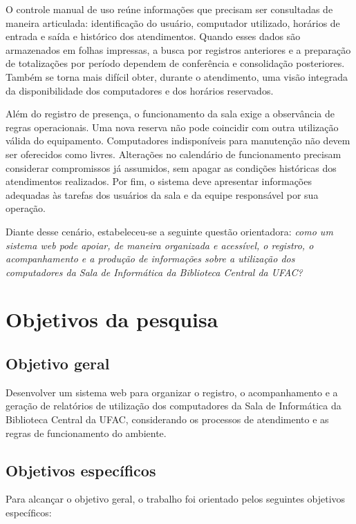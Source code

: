 O controle manual de uso reúne informações que precisam ser consultadas de maneira articulada: identificação do usuário, computador utilizado, horários de entrada e saída e histórico dos atendimentos. Quando esses dados são armazenados em folhas impressas, a busca por registros anteriores e a preparação de totalizações por período dependem de conferência e consolidação posteriores. Também se torna mais difícil obter, durante o atendimento, uma visão integrada da disponibilidade dos computadores e dos horários reservados.

Além do registro de presença, o funcionamento da sala exige a observância de regras operacionais. Uma nova reserva não pode coincidir com outra utilização válida do equipamento. Computadores indisponíveis para manutenção não devem ser oferecidos como livres. Alterações no calendário de funcionamento precisam considerar compromissos já assumidos, sem apagar as condições históricas dos atendimentos realizados. Por fim, o sistema deve apresentar informações adequadas às tarefas dos usuários da sala e da equipe responsável por sua operação.

Diante desse cenário, estabeleceu-se a seguinte questão orientadora: \emph{como um sistema web pode apoiar, de maneira organizada e acessível, o registro, o acompanhamento e a produção de informações sobre a utilização dos computadores da Sala de Informática da Biblioteca Central da UFAC?}

\section{Objetivos da pesquisa}\label{sec:objetivos}

\subsection{Objetivo geral}

Desenvolver um sistema web para organizar o registro, o acompanhamento e a geração de relatórios de utilização dos computadores da Sala de Informática da Biblioteca Central da UFAC, considerando os processos de atendimento e as regras de funcionamento do ambiente.

\subsection{Objetivos específicos}

Para alcançar o objetivo geral, o trabalho foi orientado pelos seguintes objetivos específicos:

